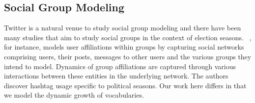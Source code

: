 \begin{comment}
\subsection{Flawed Studies?}
Recent coverage of election forecasting using Twitter has been critical, e.g.,
see~\cite{metaxas2011not,gayo2012wanted}
These publications not only list pertinent problems
in using Twitter to forecast elections but also detail recommendations on how to make such methodologies better.
Gayo-Avello surveys %
the state-of-the-art approaches in predicting elections, 
most of which have been detailed above.
Gayo-Avello argues that post-hoc analysis of elections in retrospect must not count as valid predictions and that researchers 
must be wary of the \emph{file drawer} effect, i.e., the act of filing away negative results and publishing 
only the positive results. His major points of contention against such models are:
lack of explainability, no direct way to model a `vote' in social media, self-selection bias,
unrepresentativeness of Twitter demographics, lack of sophisticated sentiment modeling strategies
(e.g., to detect humor and sarcasm that abound in political conversations), and inability to capture
indifferences among the voting public (i.e., 
abstaining from tweeting about politics can carry as much signal as explicit mentions
of candidates). Finally, it has been shown that many of these models %
do not outperform a simple
base model that forecasts success for the incumbent.
Our approach here is to aid in better modeling of social groups and improve such predictions.
A truly comprehensive system will utilize social media as just one of its strategies in forecasting and
we do not make any claims of developing a universal forecasting system for elections.
\end{comment}

\subsection{Social Group Modeling}
Twitter is a natural venue to study social group modeling and there have been many studies that aim to
study social groups in the context of election seasons.
~\cite{huang2012social}, for instance,
models user affiliations within groups by capturing social networks comprising users, their posts,
messages to other users and the various groups they intend to model.
Dynamics of group affiliations are captured through various interactions between these entities in the underlying
network. The authors discover hashtag usage specific to political seasons.
Our work here differs in that we model the dynamic growth of vocabularies.


